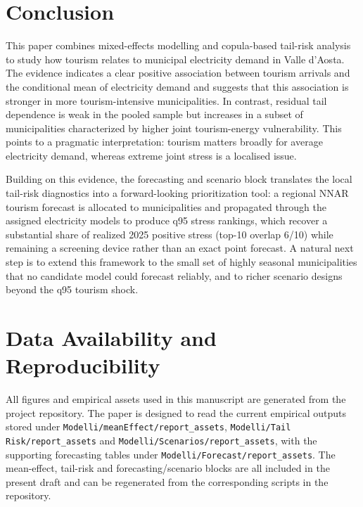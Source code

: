 \documentclass[11pt,a4paper]{article}
\begin{document}
\section{Conclusion}

This paper combines mixed-effects modelling and copula-based tail-risk analysis to study how tourism relates to municipal electricity demand in Valle d'Aosta. The evidence indicates a clear positive association between tourism arrivals and the conditional mean of electricity demand and suggests that this association is stronger in more tourism-intensive municipalities. In contrast, residual tail dependence is weak in the pooled sample but increases in a subset of municipalities characterized by higher joint tourism-energy vulnerability. This points to a pragmatic interpretation: tourism matters broadly for average electricity demand, whereas extreme joint stress is a localised issue.

Building on this evidence, the forecasting and scenario block translates the local tail-risk diagnostics into a forward-looking prioritization tool: a regional NNAR tourism forecast is allocated to municipalities and propagated through the assigned electricity models to produce q95 stress rankings, which recover a substantial share of realized 2025 positive stress (top-10 overlap 6/10) while remaining a screening device rather than an exact point forecast. A natural next step is to extend this framework to the small set of highly seasonal municipalities that no candidate model could forecast reliably, and to richer scenario designs beyond the q95 tourism shock.

\section*{Data Availability and Reproducibility}

All figures and empirical assets used in this manuscript are generated from the project repository. The paper is designed to read the current empirical outputs stored under \texttt{Modelli/meanEffect/report\_assets}, \texttt{Modelli/Tail Risk/report\_assets} and \texttt{Modelli/Scenarios/report\_assets}, with the supporting forecasting tables under \texttt{Modelli/Forecast/report\_assets}. The mean-effect, tail-risk and forecasting/scenario blocks are all included in the present draft and can be regenerated from the corresponding scripts in the repository.



\end{document}
